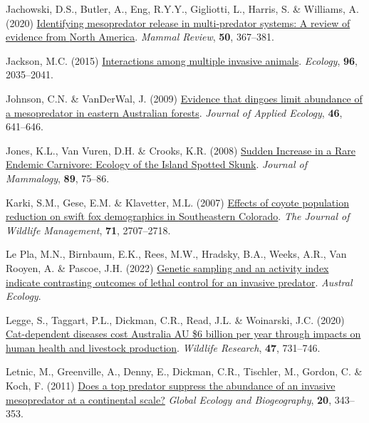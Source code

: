\documentclass[preprint, 3p, authoryear]{elsarticle} %
\newlength{\cslhangindent}
\newlength{\cslentryspacingunit} %
\newenvironment{CSLReferences}[2] %
 {%
  \setlength{\parindent}{0pt}
  \ifodd #1
  \let\oldpar\par
  \def\par{\hangindent=\cslhangindent\oldpar}
  \fi
  \setlength{\parskip}{#2\cslentryspacingunit}
 }%
 {}
\begin{document}
\begin{CSLReferences}{1}{0}
\leavevmode{}%
Jachowski, D.S., Butler, A., Eng, R.Y.Y., Gigliotti, L., Harris, S. \& Williams, A. (2020) \href{https://doi.org/10.1111/mam.12207}{Identifying mesopredator release in multi-predator systems: A review of evidence from {North America}}. \emph{Mammal Review}, \textbf{50}, 367--381.

\leavevmode{}%
Jackson, M.C. (2015) \href{https://doi.org/10.1890/15-0171.1}{Interactions among multiple invasive animals}. \emph{Ecology}, \textbf{96}, 2035--2041.

\leavevmode{}%
Johnson, C.N. \& VanDerWal, J. (2009) \href{https://doi.org/10.1111/j.1365-2664.2009.01650.x}{Evidence that dingoes limit abundance of a mesopredator in eastern {{A}ustralian} forests}. \emph{Journal of Applied Ecology}, \textbf{46}, 641--646.

\leavevmode{}%
Jones, K.L., Van Vuren, D.H. \& Crooks, K.R. (2008) \href{https://doi.org/10.1644/07-MAMM-A-034.1}{{Sudden Increase in a Rare Endemic Carnivore: Ecology of the Island Spotted Skunk}}. \emph{Journal of Mammalogy}, \textbf{89}, 75--86.

\leavevmode{}%
Karki, S.M., Gese, E.M. \& Klavetter, M.L. (2007) \href{https://doi.org/10.2193/2006-275}{Effects of coyote population reduction on swift fox demographics in {Southeastern Colorado}}. \emph{The Journal of Wildlife Management}, \textbf{71}, 2707--2718.

\leavevmode{}%
Le Pla, M.N., Birnbaum, E.K., Rees, M.W., Hradsky, B.A., Weeks, A.R., Van Rooyen, A. \& Pascoe, J.H. (2022) \href{https://doi.org/10.1111/aec.13182}{Genetic sampling and an activity index indicate contrasting outcomes of lethal control for an invasive predator}. \emph{Austral Ecology}.

\leavevmode{}%
Legge, S., Taggart, P.L., Dickman, C.R., Read, J.L. \& Woinarski, J.C. (2020) \href{https://doi.org/10.1071/WR20089}{Cat-dependent diseases cost {Australia AU \$6} billion per year through impacts on human health and livestock production}. \emph{Wildlife Research}, \textbf{47}, 731--746.

\leavevmode{}%
Letnic, M., Greenville, A., Denny, E., Dickman, C.R., Tischler, M., Gordon, C. \& Koch, F. (2011) \href{https://doi.org/10.1111/j.1466-8238.2010.00600.x}{Does a top predator suppress the abundance of an invasive mesopredator at a continental scale?} \emph{Global Ecology and Biogeography}, \textbf{20}, 343--353.


\end{CSLReferences}
\end{document}
